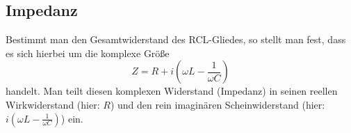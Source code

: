 \subsection{Impedanz}
Bestimmt man den Gesamtwiderstand des RCL-Gliedes, so stellt man fest, dass es sich hierbei um die komplexe Größe
\begin{equation}
  Z = R + i\left(\omega L - \frac{1}{\omega C}\right)
\end{equation}
handelt. Man teilt diesen komplexen Widerstand (Impedanz) in seinen reellen Wirkwiderstand (hier: $R$) und den rein imaginären Scheinwiderstand (hier: $i \left(\omega L - \frac{1}{\omega C}\right)$) ein.
